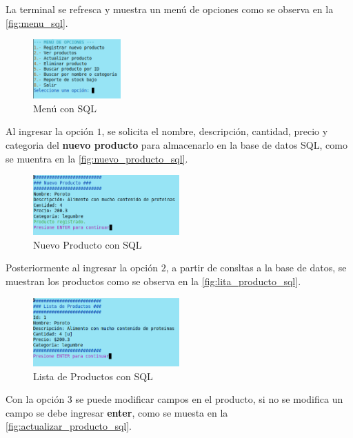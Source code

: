 \documentclass[12pt]{article}
\begin{document}
La terminal se refresca y muestra un menú de opciones como se observa en la \autoref{fig:menu_sql}.

\begin{figure}[H]
	\centering
	\setlength{\fboxrule}{0pt}
	\includegraphics[width=0.3\textwidth]{Imagenes/menu_sql.png}
	\caption{Menú con SQL}
	\label{fig:menu_sql}
\end{figure} 

Al ingresar la opción $1$, se solicita el nombre, descripción, cantidad, precio y categoria del \textbf{nuevo producto} para almacenarlo en la base de datos SQL, como se muentra en la \autoref{fig:nuevo_producto_sql}.

\begin{figure}[H]
	\centering
	\setlength{\fboxrule}{0pt}
	\includegraphics[width=0.5\textwidth]{Imagenes/nuevo_producto_sql.png}
	\caption{Nuevo Producto con SQL}
	\label{fig:nuevo_producto_sql}
\end{figure} 

Posteriormente al ingresar la opción $2$, a partir de consltas a la base de datos, se muestran los productos como se observa en la \autoref{fig:lita_producto_sql}.

\begin{figure}[H]
	\centering
	\setlength{\fboxrule}{0pt}
	\includegraphics[width=0.5\textwidth]{Imagenes/lista_productos_sql.png}
	\caption{Lista de Productos con SQL}
	\label{fig:lita_producto_sql}
\end{figure} 

Con la opción $3$ se puede modificar campos en el producto, si no se modifica un campo se debe ingresar \textbf{enter}, como se muesta en la \autoref{fig:actualizar_producto_sql}.
\end{document}
